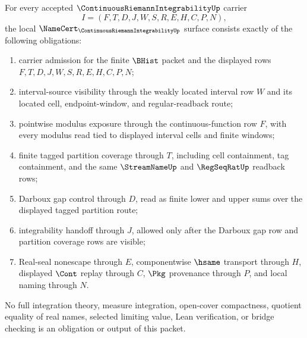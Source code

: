 \begin{theorem}
\label{thm:continuous-riemann-integrability-namecert-obligations}
For every accepted $\ContinuousRiemannIntegrabilityUp$ carrier
$$
I=(F,T,D,J,W,S,R,E,H,C,P,N),
$$
the local $\NameCert_{\ContinuousRiemannIntegrabilityUp}$ surface consists exactly of the following obligations:
\begin{enumerate}
\item carrier admission for the finite $\BHist$ packet and the displayed rows $F,T,D,J,W,S,R,E,H,C,P,N$;
\item interval-source visibility through the weakly located interval row $W$ and its located cell, endpoint-window, and regular-readback route;
\item pointwise modulus exposure through the continuous-function row $F$, with every modulus read tied to displayed interval cells and finite windows;
\item finite tagged partition coverage through $T$, including cell containment, tag containment, and the same $\StreamNameUp$ and $\RegSeqRatUp$ readback rows;
\item Darboux gap control through $D$, read as finite lower and upper sums over the displayed tagged partition route;
\item integrability handoff through $J$, allowed only after the Darboux gap row and partition coverage rows are visible;
\item Real-seal nonescape through $E$, componentwise $\hsame$ transport through $H$, displayed $\Cont$ replay through $C$, $\Pkg$ provenance through $P$, and local naming through $N$.
\end{enumerate}
No full integration theory, measure integration, open-cover compactness, quotient equality of real names, selected limiting value, Lean verification, or bridge checking is an obligation or output of this packet.
\end{theorem}
